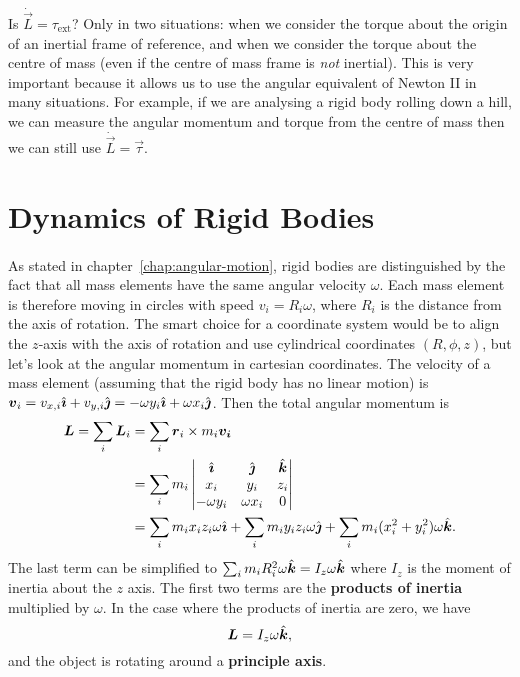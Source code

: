 \documentclass[../classical_mechanics.tex]{subfiles}
\begin{document}
        \paragraph{}
        Is $\dot{\vec{L}}=\tau_\text{ext}$?
        Only in two situations: when we consider the torque about the origin of an inertial frame of reference, and when we consider the torque about the centre of mass (even if the centre of mass frame is \textit{not} inertial).
        This is very important because it allows us to use the angular equivalent of Newton II in many situations.
        For example, if we are analysing a rigid body rolling down a hill, we can measure the angular momentum and torque from the centre of mass then we can still use $\dot{\vec{L}}=\vec{\tau}$.

    \section{Dynamics of Rigid Bodies}\label{sec:dynamics-of-rigid-bodies}
        \paragraph{}
        As stated in chapter~\ref{chap:angular-motion}, rigid bodies are distinguished by the fact that all mass elements have the same angular velocity $\omega$.
        Each mass element is therefore moving in circles with speed $v_i=R_i\omega$, where $R_i$ is the distance from the axis of rotation.
        The smart choice for a coordinate system would be to align the $z$-axis with the axis of rotation and use cylindrical coordinates $(R,\phi,z)$, but let's look at the angular momentum in cartesian coordinates.
        The velocity of a mass element (assuming that the rigid body has no linear motion) is $\boldsymbol{v}_i=v_{x,i}\hat{\boldsymbol{\imath}}+v_{y,i}\hat{\boldsymbol{\jmath}}=-\omega y_i\hat{\boldsymbol{\imath}}+\omega x_i\hat{\boldsymbol{\jmath}}$.
        Then the total angular momentum is
        \begin{align}
            \boldsymbol{L}=\sum_i\boldsymbol{L}_i&=\sum_i\boldsymbol{r}_i\times m_i\boldsymbol{v_i}\\
            &=\sum_i m_i\begin{vmatrix}
                \hat{\boldsymbol{\imath}} & \hat{\boldsymbol{\jmath}} & \hat{\boldsymbol{k}} \\
                x_i & y_i & z_i \\
                -\omega y_i & \omega x_i & 0
            \end{vmatrix}\\
            &=\sum_i m_ix_iz_i\omega\hat{\boldsymbol{\imath}}+\sum_i m_iy_iz_i\omega\hat{\boldsymbol{\jmath}}+\sum_i m_i(x_i^2+y_i^2)\omega\hat{\boldsymbol{k}}.
        \end{align}
        The last term can be simplified to $\sum_i m_iR_i^2\omega\hat{\boldsymbol{k}}=I_z\omega\hat{\boldsymbol{k}}$ where $I_z$ is the moment of inertia about the $z$ axis.
        The first two terms are the \textbf{products of inertia} multiplied by $\omega$.
        In the case where the products of inertia are zero, we have
        \begin{equation}
            \boldsymbol{L}=I_z\omega\hat{\boldsymbol{k}},
        \end{equation}
        and the object is rotating around a \textbf{principle axis}.
\end{document}
